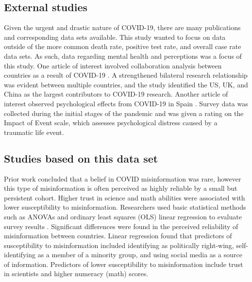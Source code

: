 \documentclass[11pt,sigconf]{acmart}
\begin{document}

\subsection{External studies}

Given the urgent and drastic nature of COVID-19, there are many publications and corresponding data sets available. This study wanted to focus on data outside of the more common death rate, positive test rate, and overall case rate data sets. As such, data regarding mental health and perceptions was a focus of this study. One article of interest involved collaboration analysis between countries as a result of COVID-19 \cite{roozenbeek}. A strengthened bilateral research relationship was evident between multiple countries, and the study identified the US, UK, and China as the largest contributors to COVID-19 research. Another article of interest observed psychological effects from COVID-19 in Spain \cite{rodriguezrey}. Survey data was collected during the initial stages of the pandemic and was given a rating on the Impact of Event scale, which assesses psychological distress caused by a traumatic life event.

\subsection{Studies based on this data set}

Prior work concluded that a belief in COVID misinformation was rare, however this type of misinformation is often perceived as highly reliable by a small but persistent  cohort. Higher trust in science and math abilities were associated with lower susceptibility to misinformation. Researchers used basic statistical methods such as ANOVAs and ordinary least squares (OLS) linear regression to evaluate survey results \cite{roozenbeek}. Significant differences were found in the perceived reliability of misinformation between countries. Linear regression found that predictors of susceptibility to misinformation included identifying as politically right-wing, self-identifying as a member of a minority group, and using social media as a source of information. Predictors of lower susceptibility to misinformation include trust in scientists and higher numeracy (math) scores.
\end{document}
